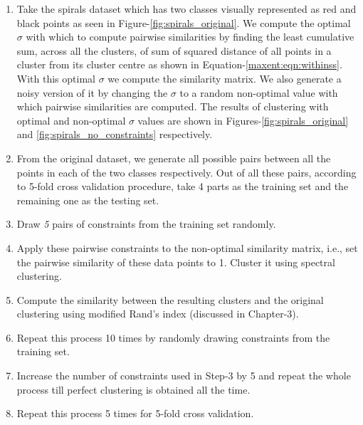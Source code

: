 \begin{enumerate}
 \item Take the spirals dataset which has two classes visually represented as red and black points as seen in Figure-\ref{fig:spirals_original}. 
We compute the optimal $\sigma$ with which to compute pairwise similarities by finding the least cumulative sum, across all the clusters, of sum of squared 
distance of all points in a cluster from its cluster centre as shown in Equation-\ref{maxent:eqn:withinss}. With this optimal $\sigma$ we compute the similarity matrix. 
We also generate a noisy version of it by changing the $\sigma$ to a random non-optimal value with which pairwise similarities are computed. 
The results of clustering with optimal and non-optimal $\sigma$ values are shown in Figures-\ref{fig:spirals_original} and \ref{fig:spirals_no_constraints} respectively.
 \item From the original dataset, we generate all possible pairs between all the points in each of the two classes respectively. Out of all these pairs, according to 5-fold cross validation procedure, take 4 parts as the training set and the remaining one as the testing set.
 \item Draw \textit{5} pairs of constraints from the training set randomly.
 \item Apply these pairwise constraints to the non-optimal similarity matrix, i.e., set the pairwise similarity of these data points to 1. Cluster it using spectral clustering.
 \item Compute the similarity between the resulting clusters and the original clustering using modified Rand's index (discussed in Chapter-3).
 \item Repeat this process 10 times by randomly drawing constraints from the training set.
 \item Increase the number of constraints used in Step-3 by 5 and repeat the whole process till perfect clustering is obtained all the time.
 \item Repeat this process 5 times for 5-fold cross validation.
 \end{enumerate}


